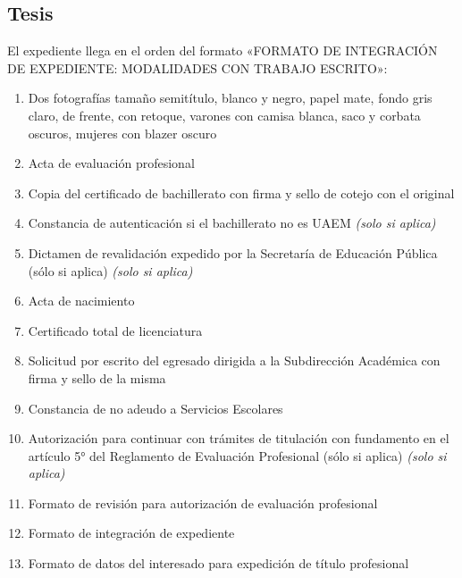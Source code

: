 \subsection{Tesis}
El expediente llega en el orden del formato «FORMATO DE INTEGRACIÓN DE EXPEDIENTE: MODALIDADES CON TRABAJO ESCRITO»:
\begin{enumerate}
  \item Dos fotografías tamaño semitítulo, blanco y negro, papel mate, fondo gris claro, de frente, con retoque, varones con camisa blanca, saco y corbata oscuros, mujeres con blazer oscuro
  \item Acta de evaluación profesional
  \item Copia del certificado de bachillerato con firma y sello de cotejo con el original
  \item Constancia de autenticación si el bachillerato no es UAEM \emph{(solo si aplica)}
  \item Dictamen de revalidación expedido por la Secretaría de Educación Pública (sólo si aplica) \emph{(solo si aplica)}
  \item Acta de nacimiento
  \item Certificado total de licenciatura
  \item Solicitud por escrito del egresado dirigida a la Subdirección Académica con firma y sello de la misma
  \item Constancia de no adeudo a Servicios Escolares
  \item Autorización para continuar con trámites de titulación con fundamento en el artículo 5° del Reglamento de Evaluación Profesional (sólo si aplica) \emph{(solo si aplica)}
  \item Formato de revisión para autorización de evaluación profesional
  \item Formato de integración de expediente
  \item Formato de datos del interesado para expedición de título profesional
\end{enumerate}
